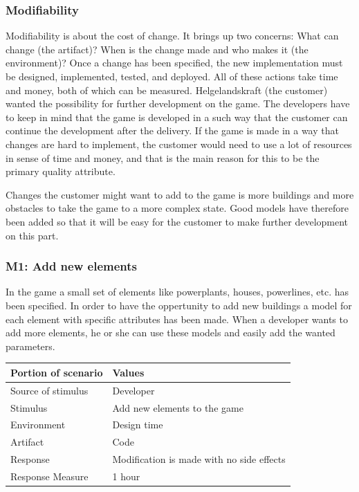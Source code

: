 \subsubsection{Modifiability}

Modifiability is about the cost of change. It brings up two concerns: What can change (the artifact)? 
When is the change made and who makes it (the environment)? 
Once a change has been specified, the new implementation must be designed, 
implemented, tested, and deployed. All of these actions take time and money, both of which can be measured.
Helgelandskraft (the customer) wanted the possibility for further development on the game. The developers
have to keep in mind that the game is developed in a such way that the customer can continue
the development after the delivery. If the game is made in a way that changes are hard to implement, 
the customer would need to use a lot of resources in sense of time and money, and that is the main 
reason for this to be the primary quality attribute.

Changes the customer might want to add to the game is more buildings and more obstacles to take
the game to a more complex state. Good models have therefore been added so that it will be easy for 
the customer to make further development on this part.

\subsubsection*{M1: Add new elements}
In the game a small set of elements like powerplants, houses, powerlines, etc. has been specified.
In order to have the oppertunity to add new buildings a model for each element with specific attributes has been made. When a developer wants to add more elements, he or she can use these models and easily add the wanted parameters. 

\begin{tabular}{| l | l |}
	\hline
	\rowcolor{gray}
	{\bf Portion of scenario} & {\bf Values} \\ \hline
	Source of stimulus & Developer\\ \hline
	Stimulus & Add new elements to the game\\ \hline
	Environment & Design time \\ \hline
	Artifact & Code \\ \hline
	Response & Modification is made with no side effects\\ \hline
	Response Measure & 1 hour\\ \hline
\end{tabular}

